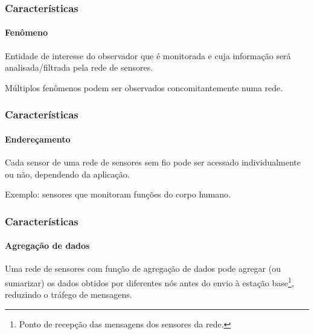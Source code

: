 \documentclass[notes]{beamer}
\begin{document}
\begin{frame}
\label{slide_14}
\frametitle{Características}
\framesubtitle{Fenômeno}

\begin{block}

Entidade de interesse do observador que é monitorada e cuja
informação será analisada/filtrada pela rede de sensores.
\end{block} \pause

\begin{block}

Múltiplos fenômenos podem ser observados concomitantemente numa rede.

\end{block}

\end{frame}

\begin{frame}
\label{slide_15}
\frametitle{Características}
\framesubtitle{Endereçamento}

\begin{block}

Cada sensor de uma rede de sensores sem fio pode ser acessado individualmente ou não, dependendo da aplicação. 

\end{block} \pause

\begin{exampleblock}

Exemplo: sensores que monitoram funções do corpo humano.

\end{exampleblock}


\end{frame}

\begin{frame}
\label{slide_16}
\frametitle{Características}
\framesubtitle{Agregação de dados}

\begin{block}

Uma rede de sensores com função de agregação de dados pode agregar (ou sumarizar) os dados obtidos por diferentes nós antes do envio à estação base\footnote{Ponto de recepção das mensagens dos sensores da rede.}, reduzindo o tráfego de mensagens.

\end{block}

\end{frame}
\end{document}
